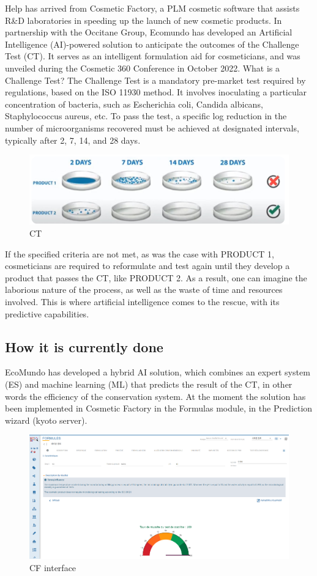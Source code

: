 \documentclass[a4paper,12pt,twoside]{report}
\begin{document}
Help has arrived from Cosmetic Factory, a PLM cosmetic software that assists R\&D laboratories in speeding up the launch of new cosmetic products. In partnership with the Occitane Group, Ecomundo has developed an Artificial Intelligence (AI)-powered solution to anticipate the outcomes of the Challenge Test (CT). It serves as an intelligent formulation aid for cosmeticians, and was unveiled during the Cosmetic 360 Conference in October 2022. 
What is a Challenge Test? The Challenge Test is a mandatory pre-market test required by regulations, based on the ISO 11930 method. It involves inoculating a particular concentration of bacteria, such as Escherichia coli, Candida albicans, Staphylococcus aureus, etc. To pass the test, a specific log reduction in the number of microorganisms recovered must be achieved at designated intervals, typically after 2, 7, 14, and 28 days.
\begin{figure}[H]
		\includegraphics[width=\textwidth]{images/CT}
	\caption[Challenge Test]{CT}
\end{figure}

If the specified criteria are not met, as was the case with PRODUCT 1, cosmeticians are required to reformulate and test again until they develop a product that passes the CT, like PRODUCT 2. As a result, one can imagine the laborious nature of the process, as well as the waste of time and resources involved. This is where artificial intelligence comes to the rescue, with its predictive capabilities.

\subsection{How it is currently done}
EcoMundo has developed a hybrid AI solution, which combines an expert system (ES) and machine learning (ML) that predicts the result of the CT, in other words the efficiency of the conservation system. 
At the moment the solution has been implemented in Cosmetic Factory in the Formulas module, in the Prediction wizard (kyoto server).
\begin{figure}[H]
		\includegraphics[width=\textwidth]{images/kyoto}
	\caption[Cosmetic Factory Interface for CT]{CF interface}
\end{figure}
\end{document}
